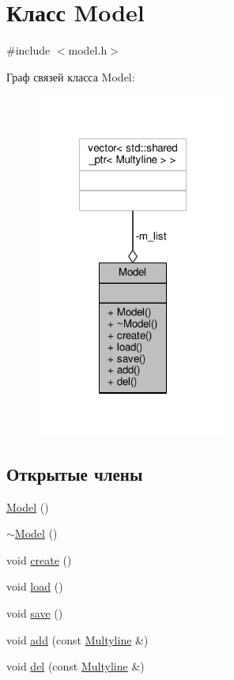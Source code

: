 \hypertarget{class_model}{\section{Класс Model}
\label{class_model}
}


{\ttfamily \#include $<$model.\-h$>$}



Граф связей класса Model\-:
\nopagebreak
\begin{figure}[H]
\begin{center}
\leavevmode
\includegraphics[width=180pt]{class_model__coll__graph}
\end{center}
\end{figure}
\subsection*{Открытые члены}
\begin{DoxyCompactItemize}
\item 
\hyperlink{class_model_ae3b375de5f6df4faf74a95d64748e048}{Model} ()
\item 
\hyperlink{class_model_ad6ebd2062a0b823db841a0b88baac4c0}{$\sim$\-Model} ()
\item 
void \hyperlink{class_model_af83f7bf343a69dd3d09131d9d2b2abe9}{create} ()
\item 
void \hyperlink{class_model_a937f7f22c88f8c6ca549b7bb98190563}{load} ()
\item 
void \hyperlink{class_model_aef4314ff5eaadebafafb9ad6dcafe5e3}{save} ()
\item 
void \hyperlink{class_model_a1cf26e1d5b881d90f91f6ae50a3c3d11}{add} (const \hyperlink{class_multyline}{Multyline} \&)
\item 
void \hyperlink{class_model_a41130e2e14fa6299db1fcf7437347eed}{del} (const \hyperlink{class_multyline}{Multyline} \&)
\end{DoxyCompactItemize}
